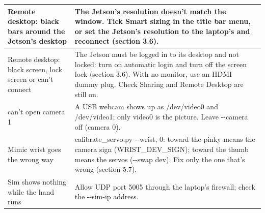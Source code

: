\documentclass[11pt,letterpaper]{article}
\newcommand{\code}[1]{\textcolor{codeblue}{\ttfamily\smaller\relax #1}}
\begin{document}
{\begin{longtable}{|>{\raggedright\arraybackslash}p{}|>{\raggedright\arraybackslash}p{}|}
Remote desktop: black bars around the Jetson's desktop & The Jetson's resolution doesn't match the window. Tick Smart sizing in the title bar menu, or set the Jetson's resolution to the laptop's and reconnect (section 3.6). \\ \hline
Remote desktop: black screen, lock screen or can't connect & The Jetson must be logged in to its desktop and not locked: turn on automatic login and turn off the screen lock (section 3.6). With no monitor, use an HDMI dummy plug. Check Sharing and Remote Desktop are still on. \\ \hline
\code{[camera] can't open camera 1} & A USB webcam shows up as \code{/\allowbreak{}dev/\allowbreak{}video0} and \code{/\allowbreak{}dev/\allowbreak{}video1}; only \code{video0} is the picture. Leave \code{-{}-{}camera} off (camera 0). \\ \hline
Mimic wrist goes the wrong way & \code{calibrate\_\allowbreak{}servo.py -{}-{}wrist}, \code{25 0}: toward the pinky means the camera sign (\code{WRIST\_\allowbreak{}DEV\_\allowbreak{}SIGN}); toward the thumb means the servos (\code{-{}-{}swap dev}). Fix only the one that's wrong (section 5.7). \\ \hline
Sim shows nothing while the hand runs & Allow UDP port 5005 through the laptop's firewall; check the \code{-{}-{}sim-{}\allowbreak{}ip} address. \\ \hline
\end{longtable}}
\end{document}
